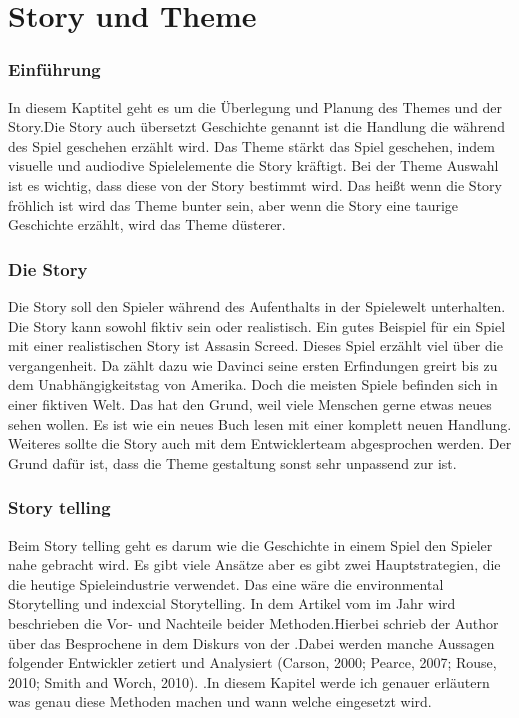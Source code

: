 \pagebreak
{}
\chapter {Story und Theme}

\subsection{Einführung}
In diesem Kaptitel geht es um die Überlegung und Planung des Themes und der Story.Die Story auch übersetzt Geschichte genannt ist die Handlung die während des Spiel geschehen erzählt wird. Das Theme stärkt das Spiel geschehen, indem visuelle und audiodive Spielelemente die Story kräftigt. Bei der Theme Auswahl ist es wichtig, dass diese von der Story bestimmt wird. Das heißt wenn die Story fröhlich ist wird das Theme bunter sein, aber wenn die Story eine taurige Geschichte erzählt, wird das Theme düsterer. 

\subsection{Die Story}
Die Story soll den Spieler während des Aufenthalts in der Spielewelt unterhalten. Die Story kann sowohl fiktiv sein oder realistisch. Ein gutes Beispiel für ein Spiel mit einer realistischen Story ist Assasin Screed. Dieses Spiel erzählt viel über die vergangenheit. Da zählt dazu wie Davinci seine ersten Erfindungen greirt bis zu dem Unabhängigkeitstag von Amerika. Doch die meisten Spiele befinden sich in einer fiktiven Welt. Das hat den Grund, weil viele Menschen gerne etwas neues sehen wollen. Es ist wie ein neues Buch lesen mit einer komplett neuen Handlung. Weiteres sollte die Story auch mit dem Entwicklerteam abgesprochen werden. Der Grund dafür ist, dass die Theme gestaltung sonst sehr unpassend zur ist. 



\subsection{Story telling}

Beim Story telling geht es darum wie die Geschichte in einem Spiel den Spieler nahe gebracht wird. Es gibt viele Ansätze aber es gibt zwei Hauptstrategien, die die heutige Spieleindustrie verwendet. Das eine wäre die environmental Storytelling und indexcial Storytelling. In dem Artikel  vom \citeauthor{Fernadez1} im Jahr \citeyear{Fernadez1} wird beschrieben die Vor- und Nachteile beider Methoden.Hierbei schrieb der Author \citeauthor{Fernadez1} über das Besprochene in dem Diskurs von der  .Dabei werden manche Aussagen folgender Entwickler zetiert und Analysiert (Carson, 2000; Pearce, 2007; Rouse, 2010; Smith and Worch, 2010). .In diesem Kapitel werde ich genauer erläutern was genau diese Methoden machen und wann welche eingesetzt wird. 


